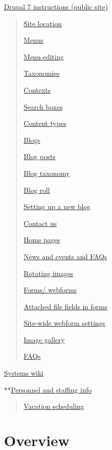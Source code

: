 \documentclass[
  openany]{book}
\begin{document}
\protect\hyperlink{drupal-7-instructions-public-site}{Drupal 7 instructions (public
site)}

\begin{quote}
\protect\hyperlink{site-location}{Site location}

\protect\hyperlink{menus}{Menus}

\protect\hyperlink{menu-editing}{Menu editing}

\protect\hyperlink{taxonomies}{Taxonomies}

\protect\hyperlink{contexts}{Contexts}

\protect\hyperlink{search-boxes}{Search boxes}

\protect\hyperlink{content-types-1}{Content types}

\protect\hyperlink{blogs}{Blogs}

\protect\hyperlink{blog-posts}{Blog posts}

\protect\hyperlink{blog-taxonomy}{Blog taxonomy}

\protect\hyperlink{blog-roll}{Blog roll}

\protect\hyperlink{setting-up-a-new-blog}{Setting up a new blog}

\protect\hyperlink{contact-us}{Contact us}

\protect\hyperlink{home-pages}{Home pages}

\protect\hyperlink{news-and-events-and-faqs}{News and events and FAQs}

\protect\hyperlink{rotating-images}{Rotating images}

\protect\hyperlink{forms-webforms}{Forms/ webforms}

\protect\hyperlink{attached-file-fields-in-forms}{Attached file fields in forms}

\protect\hyperlink{site-wide-webform-settings}{Site-wide webform settings}

\protect\hyperlink{image-gallery}{Image gallery}

\protect\hyperlink{faqs}{FAQs}
\end{quote}

\protect\hyperlink{systems-wiki}{Systems wiki}

**\protect\hyperlink{personnel-and-staffing-info}{Personnel and staffing info}

\begin{quote}
\protect\hyperlink{vacation-scheduling}{Vacation scheduling}
\end{quote}

\hypertarget{overview}{%
\chapter{Overview}\label{overview}}
\end{document}

